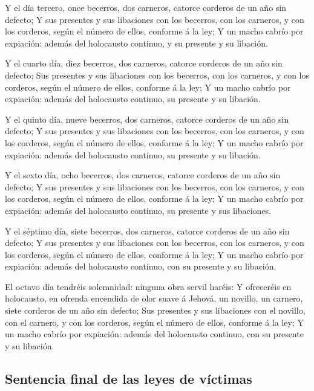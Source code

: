  Y el día tercero, once becerros, dos carneros, catorce
corderos de un año sin defecto;  Y sus presentes y sus
libaciones con los becerros, con los carneros, y con los corderos, según
el número de ellos, conforme á la ley;  Y un macho cabrío
por expiación: además del holocausto continuo, y su presente y su
libación.

 Y el cuarto día, diez becerros, dos carneros, catorce
corderos de un año sin defecto;  Sus presentes y sus
libaciones con los becerros, con los carneros, y con los corderos, según
el número de ellos, conforme á la ley;  Y un macho cabrío
por expiación: además del holocausto continuo, su presente y su
libación.

 Y el quinto día, nueve becerros, dos carneros, catorce
corderos de un año sin defecto;  Y sus presentes y sus
libaciones con los becerros, con los carneros, y con los corderos, según
el número de ellos, conforme á la ley;  Y un macho cabrío
por expiación: además del holocausto continuo, su presente y su
libación.

 Y el sexto día, ocho becerros, dos carneros, catorce
corderos de un año sin defecto;  Y sus presentes y sus
libaciones con los becerros, con los carneros, y con los corderos, según
el número de ellos, conforme á la ley;  Y un macho cabrío
por expiación: además del holocausto continuo, su presente y sus
libaciones.

 Y el séptimo día, siete becerros, dos carneros, catorce
corderos de un año sin defecto;  Y sus presentes y sus
libaciones con los becerros, con los carneros, y con los corderos, según
el número de ellos, conforme á la ley;  Y un macho cabrío
por expiación: además del holocausto continuo, con su presente y su
libación.

 El octavo día tendréis solemnidad: ninguna obra servil
haréis:  Y ofreceréis en holocausto, en ofrenda encendida
de olor suave á Jehová, un novillo, un carnero, siete corderos de un año
sin defecto;  Sus presentes y sus libaciones con el
novillo, con el carnero, y con los corderos, según el número de ellos,
conforme á la ley;  Y un macho cabrío por expiación:
además del holocausto continuo, con su presente y su libación.

\hypertarget{sentencia-final-de-las-leyes-de-vuxedctimas}{%
\subsection{Sentencia final de las leyes de
víctimas}\label{sentencia-final-de-las-leyes-de-vuxedctimas}}


